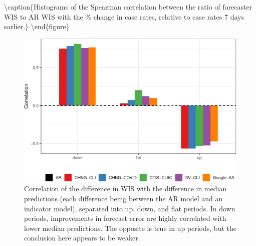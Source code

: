 \documentclass[9pt,twoside,lineno]{pnas-new}
\begin{document}
\textbackslash caption\{Histograms of the Spearman correlation between
the ratio of forecaster WIS to AR WIS with the \% change in case rates,
relative to case rates 7 days earlier.\}\label{fig:cor-wis-ratio}
\textbackslash end\{figure\}

\clearpage

\begin{figure}

{\centering \includegraphics[width=\textwidth]{fig/upswing-corr-table-1} 

}

\caption{Correlation of the difference in WIS with the difference in median predictions (each difference being between the AR model and an indicator model), separated into up, down, and flat periods. In down periods, improvements in forecast error are highly correlated with lower median predictions. The opposite is true in up periods, but the conclusion here appears to be weaker.}\label{fig:upswing-corr-table}
\end{figure}

\clearpage
\end{document}
